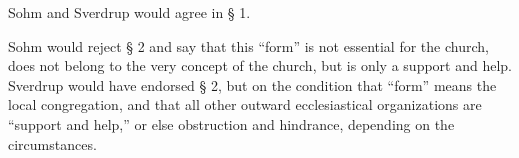 Sohm and Sverdrup would agree in § 1.

Sohm would reject § 2 and say that this ``form'' is not essential for the church, does not belong to the very concept of the church, but is only a support and help. Sverdrup would have endorsed § 2, but on the condition that ``form'' means the local congregation, and that all other outward ecclesiastical organizations are ``support and help,'' or else obstruction and hindrance, depending on the circumstances.


